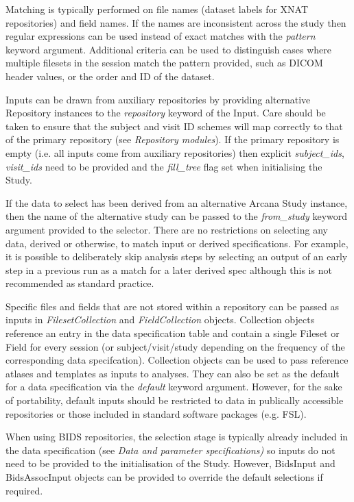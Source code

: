 \documentclass[smallextended]{svjour3}       %
\begin{document}
Matching is typically performed on file
names (dataset labels for XNAT repositories) and field names. If the
names are inconsistent across the study then regular expressions can be
used instead of exact matches with the \emph{pattern} keyword argument.
Additional criteria can be used to distinguish cases where multiple
filesets in the session match the pattern provided, such as DICOM
header values, or the order and ID of the dataset.

Inputs can be drawn from auxiliary repositories by providing alternative
Repository instances to the \emph{repository} keyword of the Input.
Care should be taken to ensure that the subject and visit ID schemes
will map correctly to that of the primary repository (see
\emph{Repository modules}). If the primary repository is empty (i.e. all
inputs come from auxiliary repositories) then explicit
\emph{subject\_ids}, \emph{visit\_ids} need to be provided and the
\emph{fill\_tree} flag set when initialising the Study.

If the data to select has been derived from an alternative Arcana Study
instance, then the name of the alternative study can be passed to the
\emph{from\_study} keyword argument provided to the selector. There are
no restrictions on selecting any data, derived or otherwise, to match
input or derived specifications. For example, it is possible to
deliberately skip analysis steps by selecting an output of an early step
in a previous run as a match for a later derived spec although this is
not recommended as standard practice.

Specific files and fields that are not stored within a repository can be
passed as inputs in \emph{FilesetCollection} and \emph{FieldCollection}
objects. Collection objects reference an entry in the data specification
table and contain a single Fileset or Field for every session (or
subject/visit/study depending on the frequency of the corresponding data
specifcation). Collection objects can be used to pass reference atlases and
templates as inputs to analyses. They can also be set as the default
for a data specification via the \emph{default} keyword
argument. However, for the sake of portability, default inputs should be
restricted to data in publically accessible repositories or those included in
standard software packages (e.g. FSL).

When using BIDS repositories, the selection stage is typically already
included in the data specification (see \emph{Data and parameter
specifications)} so inputs do not need to be provided to the
initialisation of the Study. However, BidsInput and
BidsAssocInput objects can be provided to override the default
selections if required.
\end{document}
